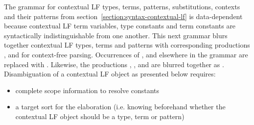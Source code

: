 \documentclass[11pt]{article}
\newcommand{\LF}{\textsc{LF}\xspace}
\begin{document}
The grammar for contextual \LF types, terms, patterns, substitutions, contexts and their patterns from section~\ref{section:syntax-contextual-lf} is data-dependent because contextual \LF term variables, type constants and term constants are syntactically indistinguishable from one another.
This next grammar blurs together contextual \LF types, terms and patterns with corresponding productions ,  and  for context-free parsing.
Occurrences of ,  and  elsewhere in the grammar are replaced with .
Likewise, the productions , ,  and  are blurred together as .
Disambiguation of a contextual \LF object as presented below requires:
\begin{itemize}
\item complete scope information to resolve constants
\item a target sort for the elaboration (i.e. knowing beforehand whether the contextual \LF object should be a type, term or pattern)
\end{itemize}
\end{document}
